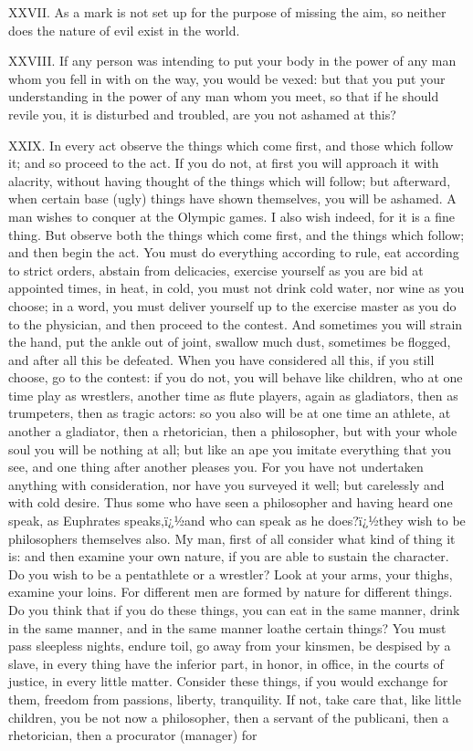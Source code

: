 XXVII. As a mark is not set up for the purpose of missing the aim, so neither does the nature of evil exist in the world.



XXVIII. If any person was intending to put your body in the power of any man whom you fell in with on the way, you would be vexed: but that you put your understanding in the power of any man whom you meet, so that if he should revile you, it is disturbed and troubled, are you not ashamed at this?



XXIX. In every act observe the things which come first, and those which follow it; and so proceed to the act. If you do not, at first you will approach it with alacrity, without having thought of the things which will follow; but afterward, when certain base (ugly) things have shown themselves, you will be ashamed. A man wishes to conquer at the Olympic games. I also wish indeed, for it is a fine thing. But observe both the things which come first, and the things which follow; and then begin the act. You must do everything according to rule, eat according to strict orders, abstain from delicacies, exercise yourself as you are bid at appointed times, in heat, in cold, you must not drink cold water, nor wine as you choose; in a word, you must deliver yourself up to the exercise master as you do to the physician, and then proceed to the contest. And sometimes you will strain the hand, put the ankle out of joint, swallow much dust, sometimes be flogged, and after all this be defeated. When you have considered all this, if you still choose, go to the contest: if you do not, you will behave like children, who at one time play as wrestlers, another time as flute players, again as gladiators, then as trumpeters, then as tragic actors: so you also will be at one time an athlete, at another a gladiator, then a rhetorician, then a philosopher, but with your whole soul you will be nothing at all; but like an ape you imitate everything that you see, and one thing after another pleases you. For you have not undertaken anything with consideration, nor have you surveyed it well; but carelessly and with cold desire. Thus some who have seen a philosopher and having heard one speak, as Euphrates speaks,ï¿½and who can speak as he does?ï¿½they wish to be philosophers themselves also. My man, first of all consider what kind of thing it is: and then examine your own nature, if you are able to sustain the character. Do you wish to be a pentathlete or a wrestler? Look at your arms, your thighs, examine your loins. For different men are formed by nature for different things. Do you think that if you do these things, you can eat in the same manner, drink in the same manner, and in the same manner loathe certain things? You must pass sleepless nights, endure toil, go away from your kinsmen, be despised by a slave, in every thing have the inferior part, in honor, in office, in the courts of justice, in every little matter. Consider these things, if you would exchange for them, freedom from passions, liberty, tranquility. If not, take care that, like little children, you be not now a philosopher, then a servant of the publicani, then a rhetorician, then a procurator (manager) for 
